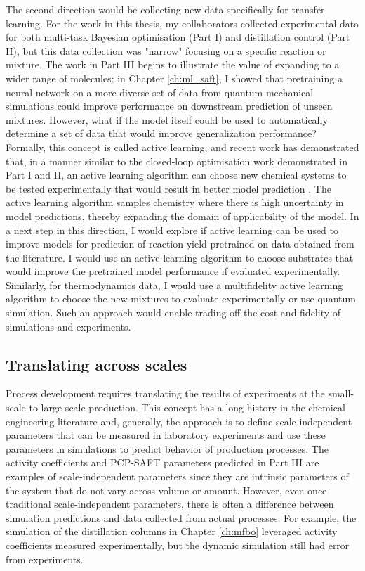 The second direction would be collecting new data specifically for transfer learning. For the work in this thesis, my collaborators collected experimental data for both multi-task Bayesian optimisation (Part I) and distillation control (Part II), but this data collection was "narrow" focusing on a specific reaction or mixture. The work in Part III begins to illustrate the value of expanding to a wider range of molecules; in Chapter \ref{ch:ml_saft}, I showed that pretraining a neural network on a more diverse set of data from quantum mechanical simulations could improve performance on downstream prediction of unseen mixtures. However, what if the model itself could be used to automatically determine a set of data that would  improve generalization performance? Formally, this concept is called active learning, and recent work has demonstrated that, in a manner similar to the closed-loop optimisation work demonstrated in Part I and II, an active learning algorithm can choose new chemical systems to be tested experimentally that would result in better model prediction \cite{Angello2022}. The active learning algorithm samples chemistry where there is high uncertainty in model predictions, thereby expanding the domain of applicability of the model.  In a next step in this direction, I would explore if active learning can be used to improve models for prediction of reaction yield pretrained on data obtained from the literature. I would use an active learning algorithm to choose substrates that would improve the pretrained model performance if evaluated experimentally. Similarly, for thermodynamics data, I would use a multifidelity active learning algorithm to choose the new mixtures to evaluate experimentally or use quantum simulation. Such an approach would enable trading-off the cost and fidelity of simulations and experiments. 

\subsection{Translating across scales}

Process development requires translating the results of experiments at the small-scale to large-scale production. This concept has a long history in the chemical engineering literature and, generally, the approach is to define scale-independent parameters that can be measured in laboratory experiments and use these parameters in simulations to predict behavior of production processes. The activity coefficients and PCP-SAFT parameters predicted in Part III are examples of scale-independent parameters since they are intrinsic parameters of the system that do not vary across volume or amount. However, even once traditional  scale-independent parameters, there is often a difference between simulation predictions and data collected from actual processes. For example, the simulation of the distillation columns in Chapter \ref{ch:mfbo} leveraged activity coefficients measured experimentally, but the dynamic simulation still had error from experiments. 

